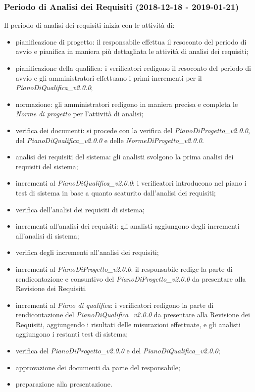 	\subsubsection{Periodo di Analisi dei Requisiti (2018-12-18 - 2019-01-21)}	
 Il periodo di analisi dei requisiti inizia con le attività di:
			\begin{itemize}
				\item pianificazione di progetto: il responsabile effettua il resoconto del periodo di avvio e pianifica in maniera più dettagliata le attività di analisi dei requisiti; 
				\item pianificazione della qualifica: i verificatori redigono il resoconto del periodo di avvio e gli amministratori effettuano i primi incrementi per il \textit{PianoDiQualifica\_v2.0.0};
				\item normazione: gli amministratori redigono in maniera precisa e completa le \textit{Norme di progetto} per l'attività di analisi;
				\item verifica dei documenti: si procede con la verifica del \textit{PianoDiProgetto\_v2.0.0}, del \textit{PianoDiQualifica\_v2.0.0} e delle \textit{NormeDiProgetto\_v2.0.0}.
				\item analisi dei requisiti del sistema: gli analisti svolgono la prima analisi dei requisiti del sistema;
				\item incrementi al \textit{PianoDiQualifica\_v2.0.0}: i verificatori introducono nel piano i test di sistema in base a quanto scaturito dall'analisi dei requisiti;
				\item verifica dell'analisi dei requisiti di sistema;
				\item incrementi all'analisi dei requisiti: gli analisti aggiungono degli incrementi all'analisi di sistema;
				\item verifica degli incrementi all'analisi dei requisiti;
				\item incrementi al \textit{PianoDiProgetto\_v2.0.0}: il responsabile redige la parte di rendicontazione e consuntivo del \textit{PianoDiProgetto\_v2.0.0} da presentare alla Revisione dei Requisiti.
				\item incrementi al \textit{Piano di qualifica}: i verificatori redigono la parte di rendicontazione del \textit{PianoDiQualifica\_v2.0.0} da presentare alla Revisione dei Requisiti, aggiungendo i risultati delle misurazioni effettuate, e gli analisti aggiungono i restanti test di sistema;
				\item verifica del \textit{PianoDiProgetto\_v2.0.0} e del \textit{PianoDiQualifica\_v2.0.0};
				\item approvazione dei documenti da parte del responsabile;
				\item preparazione alla presentazione.			
			\end{itemize}
			
